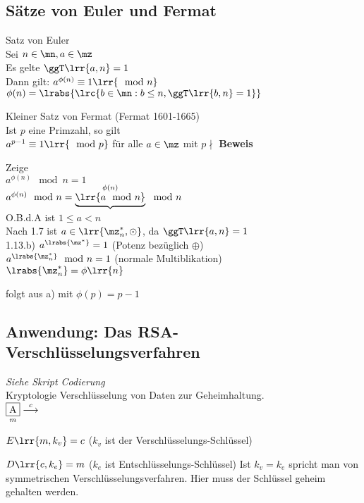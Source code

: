 \subsection{Sätze von Euler und Fermat}
		\item Satz von Euler\\
			Sei $n\in\mn, a\in\mz$\\
			Es gelte $\ggT\lrr{a,n}=1$\\
			Dann gilt: $a^{\phi(n)}\equiv 1\lrr{\mod n}$\\
			$\phi(n)=\lrabs{\lrc{b\in\mn: b\leq n, \ggT\lrr{b,n}=1}}$
		\item Kleiner Satz von Fermat (Fermat 1601-1665)\\
			Ist $p$ eine Primzahl, so gilt\\
			$a^{p-1}\equiv 1\lrr{\mod p}$ für alle $a\in\mz$ mit $p\nmid$
	\subExEnd
	\textbf{Beweis}
		\item Zeige\\
			$a^{\phi(n)}\mod n = 1$\\
			$a^{\phi(n)}\mod n = \underbrace{\lrr{a\mod n}}^{\phi(n)}\mod n$\\
			O.B.d.A ist $1\leq a < n$\\
			Nach 1.7 ist $a\in\lrr{\mz_n^*,\odot}$, da $\ggT\lrr{a,n}=1$\\
			1.13.b) $a^{\lrabs{\mz^*}}=1$ (Potenz bezüglich $\oplus$)\\
			$a^{\lrabs{\mz_n^*}}\mod n = 1$ (normale Multiblikation)\\
			$\lrabs{\mz_n^*}=\phi\lrr{n}$
		\item folgt aus a) mit $\phi(p) = p-1$
	\subExEnd
\subsection{Anwendung: Das RSA-Verschlüsselungsverfahren}
	\textit{Siehe Skript Codierung} \\
	Kryptologie Verschlüsselung von Daten zur Geheimhaltung.\\
	$\underset{m}{\mbox{\fbox{A}}}\overset{c}{\longrightarrow}$
		\item $E\lrr{m,k_v}=c$ ($k_v$ ist der Verschlüsselungs-Schlüssel)
		\item $D\lrr{c,k_e}=m$ ($k_e$ ist Entschlüsselungs-Schlüssel)
	\subExEnd
	Ist $k_v = k_e$ spricht man von symmetrischen Verschlüsselungsverfahren. Hier muss der Schlüssel geheim gehalten werden.
	

